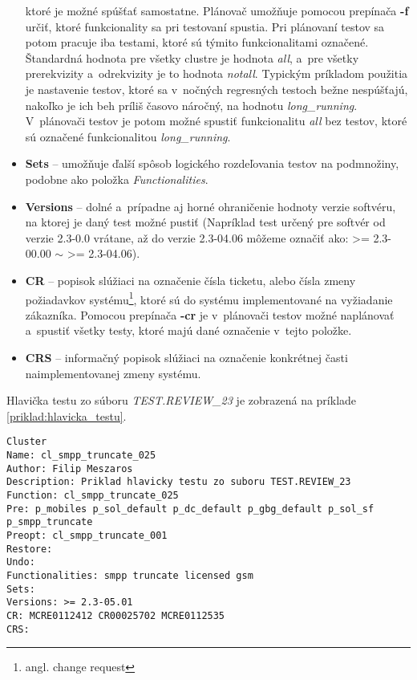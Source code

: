 \begin{itemize}
ktoré je možné spúšťať samostatne. 
Plánovač umožňuje pomocou prepínača \textbf{-f} určiť, ktoré 
funkcionality sa pri testovaní spustia.
Pri plánovaní testov sa potom pracuje iba testami, ktoré sú týmito 
funkcionalitami označené.
Štandardná hodnota pre všetky clustre je hodnota \textit{all}, a~pre 
všetky prerekvizity a~odrekvizity je to hodnota \textit{notall}.
Typickým príkladom použitia je nastavenie testov, ktoré sa v~nočných 
regresných testoch bežne nespúšťajú, nakoľko je ich beh príliš časovo náročný, 
na hodnotu \textit{long\_running}.
V~plánovači testov je potom možné spustiť funkcionalitu \textit{all} bez testov, 
ktoré sú označené funkcionalitou \textit{long\_running}.
\item \textbf{Sets} -- umožňuje ďalší spôsob logického rozdeľovania testov 
na podmnožiny, podobne ako položka \textit{Functionalities}.
\item \textbf{Versions} -- dolné a~prípadne aj horné ohraničenie hodnoty 
verzie softvéru, na ktorej je daný test možné pustiť
(Napríklad test určený pre softvér od verzie 2.3-0.0 vrátane, 
až do verzie 2.3-04.06 môžeme označiť ako: \textgreater= 2.3-00.00 
$\sim$ \textgreater= 2.3-04.06).
\item \textbf{CR} -- popisok slúžiaci na označenie čísla ticketu, alebo 
čísla zmeny požiadavkov systému\footnote{angl. change request}, ktoré sú 
do systému implementované na vyžiadanie zákazníka. 
Pomocou prepínača \textbf{-cr} je v~plánovači testov možné naplánovať 
a~spustiť všetky testy, ktoré majú dané označenie v~tejto položke.
\item \textbf{CRS} -- informačný popisok slúžiaci na označenie konkrétnej 
časti naimplementovanej zmeny systému. 
\end{itemize}

Hlavička testu zo súboru \emph{TEST.REVIEW\_23} je zobrazená na 
príklade \ref{priklad:hlavicka_testu}.

\noindent\begin{minipage}{\textwidth}
\begin{lstlisting}[caption=Hlavička testu,label=priklad:hlavicka_testu]
Cluster
Name: cl_smpp_truncate_025
Author: Filip Meszaros
Description: Priklad hlavicky testu zo suboru TEST.REVIEW_23
Function: cl_smpp_truncate_025
Pre: p_mobiles p_sol_default p_dc_default p_gbg_default p_sol_sf p_smpp_truncate
Preopt: cl_smpp_truncate_001
Restore:
Undo:
Functionalities: smpp truncate licensed gsm
Sets:
Versions: >= 2.3-05.01
CR: MCRE0112412 CR00025702 MCRE0112535
CRS:
\end{lstlisting}
\end{minipage}

